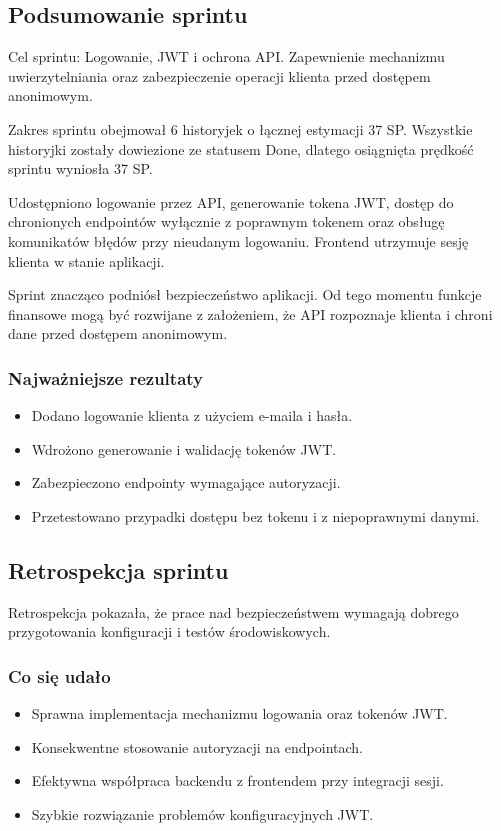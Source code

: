 \documentclass[12pt,a4paper]{article}
\begin{document}
\subsection*{Podsumowanie sprintu}
Cel sprintu: Logowanie, JWT i ochrona API. Zapewnienie mechanizmu uwierzytelniania oraz zabezpieczenie operacji klienta przed dostępem anonimowym.

Zakres sprintu obejmował 6 historyjek o łącznej estymacji 37 SP. Wszystkie historyjki zostały dowiezione ze statusem Done, dlatego osiągnięta prędkość sprintu wyniosła 37 SP.

Udostępniono logowanie przez API, generowanie tokena JWT, dostęp do chronionych endpointów wyłącznie z poprawnym tokenem oraz obsługę komunikatów błędów przy nieudanym logowaniu. Frontend utrzymuje sesję klienta w stanie aplikacji.

Sprint znacząco podniósł bezpieczeństwo aplikacji. Od tego momentu funkcje finansowe mogą być rozwijane z założeniem, że API rozpoznaje klienta i chroni dane przed dostępem anonimowym.

\subsubsection*{Najważniejsze rezultaty}
\begin{itemize}
\item Dodano logowanie klienta z użyciem e-maila i hasła.
\item Wdrożono generowanie i walidację tokenów JWT.
\item Zabezpieczono endpointy wymagające autoryzacji.
\item Przetestowano przypadki dostępu bez tokenu i z niepoprawnymi danymi.
\end{itemize}

\subsection*{Retrospekcja sprintu}
Retrospekcja pokazała, że prace nad bezpieczeństwem wymagają dobrego przygotowania konfiguracji i testów środowiskowych.

\subsubsection*{Co się udało}
\begin{itemize}
\item Sprawna implementacja mechanizmu logowania oraz tokenów JWT.
\item Konsekwentne stosowanie autoryzacji na endpointach.
\item Efektywna współpraca backendu z frontendem przy integracji sesji.
\item Szybkie rozwiązanie problemów konfiguracyjnych JWT.
\end{itemize}
\end{document}
